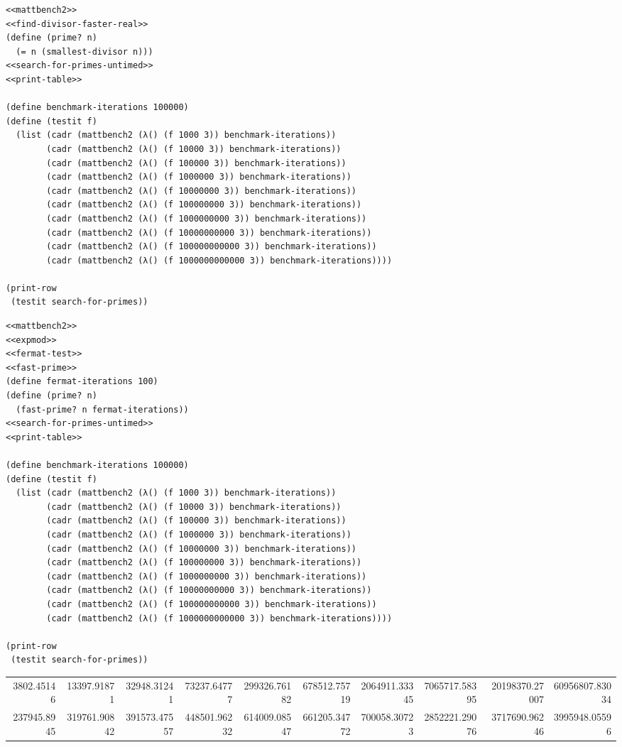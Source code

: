\documentclass[final,fleqn,titlepage]{article}
\begin{document}
\begin{verbatim}
<<mattbench2>>
<<find-divisor-faster-real>>
(define (prime? n)
  (= n (smallest-divisor n)))
<<search-for-primes-untimed>>
<<print-table>>

(define benchmark-iterations 100000)
(define (testit f)
  (list (cadr (mattbench2 (λ() (f 1000 3)) benchmark-iterations))
        (cadr (mattbench2 (λ() (f 10000 3)) benchmark-iterations))
        (cadr (mattbench2 (λ() (f 100000 3)) benchmark-iterations))
        (cadr (mattbench2 (λ() (f 1000000 3)) benchmark-iterations))
        (cadr (mattbench2 (λ() (f 10000000 3)) benchmark-iterations))
        (cadr (mattbench2 (λ() (f 100000000 3)) benchmark-iterations))
        (cadr (mattbench2 (λ() (f 1000000000 3)) benchmark-iterations))
        (cadr (mattbench2 (λ() (f 10000000000 3)) benchmark-iterations))
        (cadr (mattbench2 (λ() (f 100000000000 3)) benchmark-iterations))
        (cadr (mattbench2 (λ() (f 1000000000000 3)) benchmark-iterations))))

(print-row
 (testit search-for-primes))
\end{verbatim}

\begin{verbatim}
<<mattbench2>>
<<expmod>>
<<fermat-test>>
<<fast-prime>>
(define fermat-iterations 100)
(define (prime? n)
  (fast-prime? n fermat-iterations))
<<search-for-primes-untimed>>
<<print-table>>

(define benchmark-iterations 100000)
(define (testit f)
  (list (cadr (mattbench2 (λ() (f 1000 3)) benchmark-iterations))
        (cadr (mattbench2 (λ() (f 10000 3)) benchmark-iterations))
        (cadr (mattbench2 (λ() (f 100000 3)) benchmark-iterations))
        (cadr (mattbench2 (λ() (f 1000000 3)) benchmark-iterations))
        (cadr (mattbench2 (λ() (f 10000000 3)) benchmark-iterations))
        (cadr (mattbench2 (λ() (f 100000000 3)) benchmark-iterations))
        (cadr (mattbench2 (λ() (f 1000000000 3)) benchmark-iterations))
        (cadr (mattbench2 (λ() (f 10000000000 3)) benchmark-iterations))
        (cadr (mattbench2 (λ() (f 100000000000 3)) benchmark-iterations))
        (cadr (mattbench2 (λ() (f 1000000000000 3)) benchmark-iterations))))

(print-row
 (testit search-for-primes))
\end{verbatim}

\begin{table}[htbp]
\label{smd-vs-fermat}
\centering
\begin{tabular}{rrrrrrrrrr}
3802.45146 & 13397.91871 & 32948.31241 & 73237.64777 & 299326.76182 & 678512.75719 & 2064911.33345 & 7065717.58395 & 20198370.27007 & 60956807.83034\\
237945.8945 & 319761.90842 & 391573.47557 & 448501.96232 & 614009.08547 & 661205.34772 & 700058.30723 & 2852221.29076 & 3717690.96246 & 3995948.05596\\
\end{tabular}
\end{table}
\end{document}
